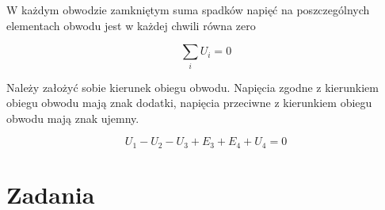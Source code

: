 W każdym obwodzie zamkniętym suma spadków napięć na poszczególnych elementach obwodu jest w każdej chwili równa zero

\begin{equation}
\sum_{i}U_i=0
\end{equation}

Należy założyć sobie kierunek obiegu obwodu. Napięcia zgodne z kierunkiem obiegu obwodu mają znak dodatki, napięcia przeciwne z kierunkiem obiegu obwodu mają znak ujemny. 

\begin{equation}
U_1-U_2-U_3+E_3+E_4+U_4=0
\end{equation}

\section{Zadania}




































